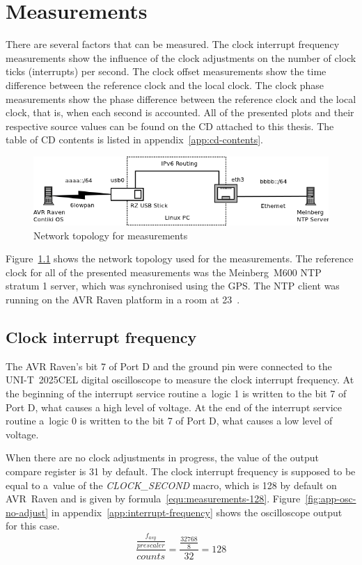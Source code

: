 
\chapter{Measurements}\label{chap:measurements}
There are several factors that can be measured.
The clock interrupt frequency measurements show the influence of the clock adjustments
on the number of clock ticks (interrupts) per second.
The clock offset measurements show the time difference between the reference clock and
the local clock.
The clock phase measurements show the phase difference between the reference clock and
the local clock, that is, when each second is accounted. %
All of the presented plots and their respective source values can be found on the CD
attached to this thesis.
The table of CD contents is listed in appendix~\ref{app:cd-contents}.
\begin{figure}[H]
	\centering
	\includegraphics[width=13cm,keepaspectratio]{fig/radvd-routing.png}
	\caption{Network topology for measurements}
	\label{fig:measurements-routing}
\end{figure}
Figure~\ref{fig:measurements-routing} shows the network topology used for the measurements.
The reference clock for all of the presented measurements was
the Meinberg~M600 NTP stratum 1 server, which was synchronised using the GPS.
The NTP client was running on the AVR Raven platform in a room at 23~\textcelsius.

\section{Clock interrupt frequency}
The AVR Raven's bit 7 of Port D and the ground pin were
connected to the UNI-T~2025CEL digital oscilloscope
to measure the clock interrupt frequency.
At the beginning of the interrupt service routine a~logic 1 is written
to the bit 7 of Port D, what causes a high level of voltage.
At the end of the interrupt service routine a~logic 0 is written
to the bit 7 of Port D, what causes a low level of voltage.

When there are no clock adjustments in progress, the value of the output compare register is 31 by default.
The clock interrupt frequency
is supposed to be equal to a~value of the {\it{CLOCK\_SECOND}} macro, which is 128 by default on AVR~Raven
and is given by formula~\ref{equ:measurements-128}.
Figure~\ref{fig:app-osc-no-adjust} in appendix~\ref{app:interrupt-frequency} shows the oscilloscope output 
for this case.
\begin{equation}
\label{equ:measurements-128}
\frac{\frac{f_{asy}}{prescaler}}{counts} = \frac{\frac{32768}{8}}{32} = 128
\end{equation}

